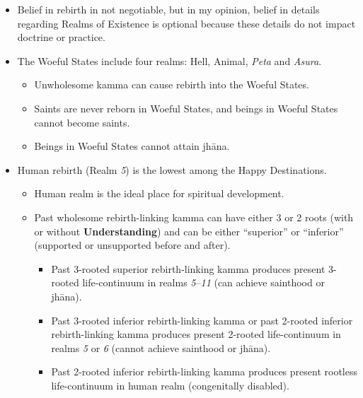 \begin{itemize}

\item Belief in rebirth in not negotiable, but in my opinion, belief in details regarding Realms of Existence is optional because these details do not impact doctrine or practice.

\item The Woeful States include four realms: Hell, Animal, \textit{Peta} and \textit{Asura}.

\begin{itemize}

\item Unwholesome kamma can cause rebirth into the Woeful States.

\item Saints are never reborn in Woeful States, and beings in Woeful States cannot become saints.

\item Beings in Woeful States cannot attain jhāna.

\end{itemize}

\item Human rebirth (Realm \textit{5}) is the lowest among the Happy Destinations.

\begin{itemize}

\item Human realm is the ideal place for spiritual development.

\item Past wholesome rebirth-linking kamma can have either 3 or 2 roots (with or without \textbf{Understanding}) and can be either “superior” or “inferior” (supported or unsupported before and after).

\begin{itemize}

\item Past 3-rooted superior rebirth-linking kamma produces present 3-rooted life-continuum in realms \textit{5}--\textit{11} (can achieve sainthood or jhāna).

\item Past 3-rooted inferior rebirth-linking kamma or past 2-rooted inferior rebirth-linking kamma produces present 2-rooted life-continuum in realms \textit{5} or \textit{6} (cannot achieve sainthood or jhāna).

\item Past 2-rooted inferior rebirth-linking kamma produces present rootless life-continuum in human realm (congenitally disabled).


\end{itemize}
\end{itemize}
\end{itemize}

